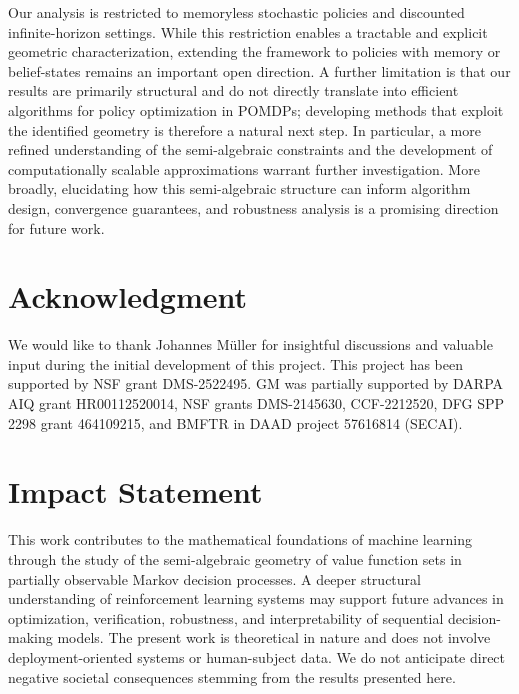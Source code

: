\documentclass{article}
\theoremstyle{definition}
\theoremstyle{remark}
\begin{document}
Our analysis is restricted to memoryless stochastic policies and discounted infinite-horizon settings. While this restriction enables a tractable and explicit geometric characterization, extending the framework to policies with memory or belief-states remains an important open direction. A further limitation is that our results are primarily structural and do not directly translate into efficient algorithms for policy optimization in POMDPs; developing methods that exploit the identified geometry is therefore a natural next step. In particular, a more refined understanding of the semi-algebraic constraints and the development of computationally scalable approximations warrant further investigation. More broadly, elucidating how this semi-algebraic structure can inform algorithm design, convergence guarantees, and robustness analysis is a promising direction for future work.


\section*{Acknowledgment} 

We would like to thank Johannes M\"uller for insightful discussions and valuable input during the initial development of this project. 
%
This project has been supported by 
NSF grant DMS-2522495. 
GM was partially supported by 
DARPA AIQ grant HR00112520014, 
NSF grants 
DMS-2145630, 
CCF-2212520, 
DFG SPP 2298 grant 464109215, 
and BMFTR in DAAD project 57616814 (SECAI). 


\section*{Impact Statement}

This work contributes to the mathematical foundations of machine learning through the study of the semi-algebraic geometry of value function sets in partially observable Markov decision processes. A deeper structural understanding of reinforcement learning systems may support future advances in optimization, verification, robustness, and interpretability of sequential decision-making models. The present work is theoretical in nature and does not involve deployment-oriented systems or human-subject data. We do not anticipate direct negative societal consequences stemming from the results presented here. 




\end{document}
